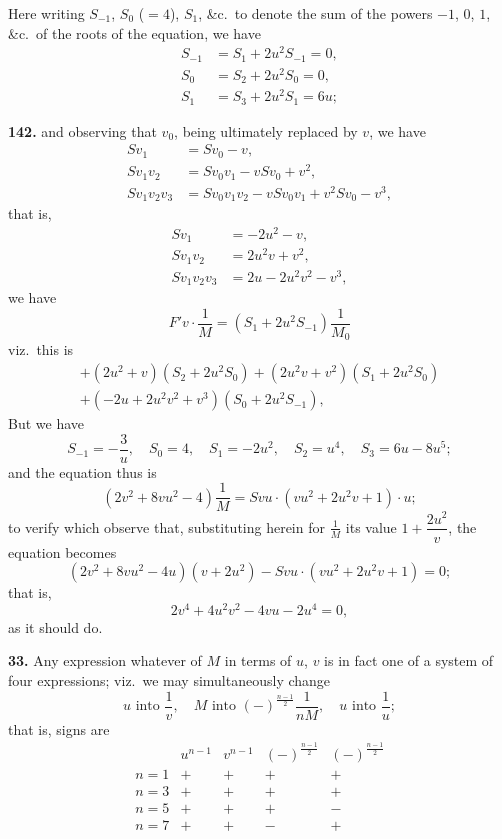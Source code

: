 \documentclass[11pt,a4paper]{book}
\begin{document}
Here writing $S_{-1}$, $S_0$ ($= 4$), $S_1$, \&c.\ to denote the sum of the powers $-1$, $0$, $1$, \&c.\ of the roots of the equation, we have
\begin{align*}
S_{-1} &= S_1 + 2u^2S_{-1} = 0, \\
S_0 &= S_2 + 2u^2S_0 = 0, \\
S_1 &= S_3 + 2u^2S_1 = 6u;
\end{align*}


\noindent\textbf{142.} and observing that $v_0$, being ultimately replaced by $v$, we have
\begin{align*}
Sv_1 &= Sv_0 - v, \\
Sv_1v_2 &= Sv_0v_1 - vSv_0 + v^2, \\
Sv_1v_2v_3 &= Sv_0v_1v_2 - vSv_0v_1 + v^2Sv_0 - v^3,
\end{align*}
that is,
\begin{align*}
Sv_1 &= -2u^2 - v, \\
Sv_1v_2 &= 2u^2v + v^2, \\
Sv_1v_2v_3 &= 2u - 2u^2v^2 - v^3,
\end{align*}
we have
\[
F'v \cdot \frac{1}{M} = (S_1 + 2u^2S_{-1})\frac{1}{M_0}
\]
viz.\ this is
\begin{multline*}
+ (2u^2 + v)(S_2 + 2u^2S_0) + (2u^2v + v^2)(S_1 + 2u^2S_0) \\
+ (-2u + 2u^2v^2 + v^3)(S_0 + 2u^2S_{-1}),
\end{multline*}
But we have
\[
S_{-1} = -\frac{3}{u}, \quad S_0 = 4, \quad S_1 = -2u^2, \quad S_2 = u^4, \quad S_3 = 6u - 8u^5;
\]
and the equation thus is
\[
(2v^2 + 8vu^2 - 4)\frac{1}{M} = Svu \cdot (vu^2 + 2u^2v + 1) \cdot u;
\]
to verify which observe that, substituting herein for $\frac{1}{M}$ its value $1 + \dfrac{2u^2}{v}$, the equation becomes
\[
(2v^2 + 8vu^2 - 4u)(v + 2u^2) - Svu \cdot (vu^2 + 2u^2v + 1) = 0;
\]
that is,
\[
2v^4 + 4u^2v^2 - 4vu - 2u^4 = 0,
\]
as it should do.

\medskip
\noindent\textbf{33.} Any expression whatever of $M$ in terms of $u$, $v$ is in fact one of a system of four expressions; viz.\ we may simultaneously change
\[
u \text{ into } \frac{1}{v}, \quad M \text{ into } (-)^{\frac{n-1}{2}}\frac{1}{nM}, \quad u \text{ into } \frac{1}{u};
\]
that is, signs are
\[
\begin{array}{c|cccc}
& u^{n-1} & v^{n-1} & (-)^{\frac{n-1}{2}} & (-)^{\frac{n-1}{2}} \\
\hline
n = 1 & + & + & + & + \\
n = 3 & + & + & + & + \\
n = 5 & + & + & + & - \\
n = 7 & + & + & - & + \\
\end{array}
\]
\end{document}

